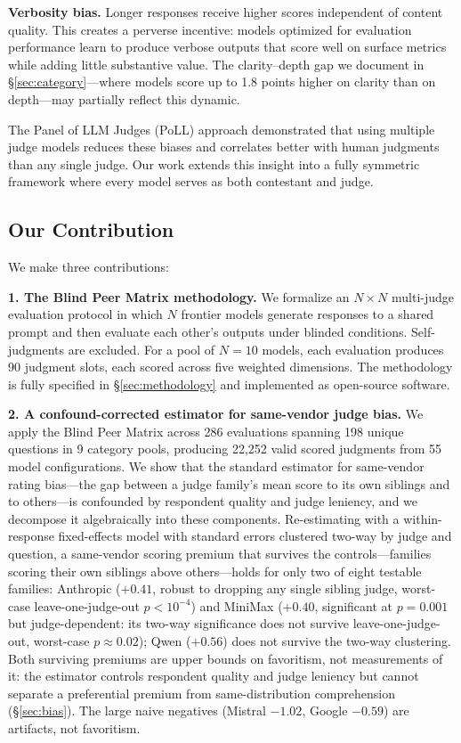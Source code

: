 \documentclass{article}
\begin{document}
\textbf{Verbosity bias.} Longer responses receive higher scores independent of content quality. This creates a perverse incentive: models optimized for evaluation performance learn to produce verbose outputs that score well on surface metrics while adding little substantive value. The clarity--depth gap we document in \S\ref{sec:category}---where models score up to 1.8 points higher on clarity than on depth---may partially reflect this dynamic.

The Panel of LLM Judges (PoLL) approach \citep{verga2024replacing} demonstrated that using multiple judge models reduces these biases and correlates better with human judgments than any single judge. Our work extends this insight into a fully symmetric framework where every model serves as both contestant and judge.

\subsection{Our Contribution}

We make three contributions:

\textbf{1. The Blind Peer Matrix methodology.} We formalize an $N \times N$ multi-judge evaluation protocol in which $N$ frontier models generate responses to a shared prompt and then evaluate each other's outputs under blinded conditions. Self-judgments are excluded. For a pool of $N = 10$ models, each evaluation produces 90 judgment slots, each scored across five weighted dimensions. The methodology is fully specified in \S\ref{sec:methodology} and implemented as open-source software.

\textbf{2. A confound-corrected estimator for same-vendor judge bias.} We apply the Blind Peer Matrix across 286 evaluations spanning 198 unique questions in 9 category pools, producing 22,252 valid scored judgments from 55 model configurations. We show that the standard estimator for same-vendor rating bias---the gap between a judge family's mean score to its own siblings and to others---is confounded by respondent quality and judge leniency, and we decompose it algebraically into these components. Re-estimating with a within-response fixed-effects model with standard errors clustered two-way by judge and question, a same-vendor scoring premium that survives the controls---families scoring their own siblings above others---holds for only two of eight testable families: Anthropic ($+0.41$, robust to dropping any single sibling judge, worst-case leave-one-judge-out $p < 10^{-4}$) and MiniMax ($+0.40$, significant at $p = 0.001$ but judge-dependent: its two-way significance does not survive leave-one-judge-out, worst-case $p \approx 0.02$); Qwen ($+0.56$) does not survive the two-way clustering. Both surviving premiums are upper bounds on favoritism, not measurements of it: the estimator controls respondent quality and judge leniency but cannot separate a preferential premium from same-distribution comprehension (\S\ref{sec:bias}). The large naive negatives (Mistral $-1.02$, Google $-0.59$) are artifacts, not favoritism.
\end{document}
